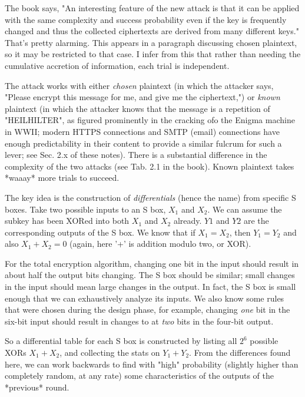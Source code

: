 \documentclass[%
 aip,
 jmp,%
 amsmath,amssymb,
 reprint,%
]{revtex4-1}
\begin{document}
The book says, "An interesting feature of the new attack is that it
can be applied with the same complexity and success probability even
if the key is frequently changed and thus the collected ciphertexts
are derived from many different keys."  That's pretty alarming.  This
appears in a paragraph discussing chosen plaintext, so it may be
restricted to that case.  I infer from this that rather than needing
the cumulative accretion of information, each trial is independent.

The attack works with either \emph{chosen} plaintext (in which the attacker
says, "Please encrypt this message for me, and give me the
ciphertext,") or \emph{known} plaintext (in which the attacker knows that
the message is a repetition of "HEILHILTER", as figured prominently in
the cracking ofo the Enigma machine in WWII; modern HTTPS connections and
SMTP (email) connections have enough predictability in their content
to provide a similar fulcrum for such a lever; see Sec. 2.x of these
notes).  There is a substantial difference in the complexity of the
two attacks (see Tab. 2.1 in the book).  Known plaintext takes *waaay*
more trials to succeed.


The key idea is the construction of \emph{differentials} (hence the name)
from specific S boxes.  Take two possible inputs to an S box, $X_1$
and $X_2$.  We can assume the subkey has been XORed into both $X_1$
and $X_2$ already.  $Y1$ and $Y2$ are the corresponding outputs of the
S box.  We know that if $X_1 = X_2$, then $Y_1 = Y_2$ and also $X_1 +
X_2 = 0$ (again, here '+' is addition modulo two, or XOR).

For the total encryption algorithm, changing one bit in the input
should result in about half the output bits changing.  The S box
should be similar; small changes in the input should mean large
changes in the output.  In fact, the S box is small enough that we can
exhaustively analyze its inputs.  We also know some rules that were
chosen during the design phase, for example, changing \emph{one} bit in the
six-bit input should result in changes to at \emph{two} bits in the
four-bit output.

So a differential table for each S box is constructed by listing all
$2^6$ possible XORs $X_1 + X_2$, and collecting the stats on $Y_1 +
Y_2$.  From the differences found here, we can work backwards to find
with "high" probability (slightly higher than completely random, at
any rate) some characteristics of the outputs of the *previous* round.
\end{document}
